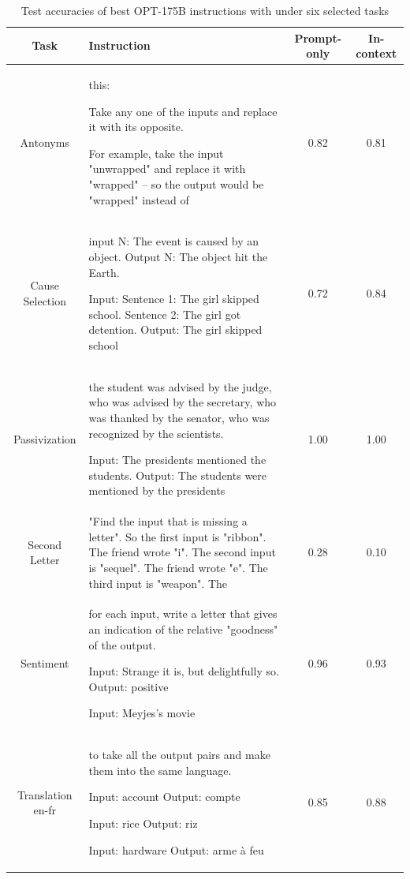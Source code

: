 \begin{table}[H]
\caption{Test accuracies of best OPT-175B instructions with \algname under six selected tasks}
\label{tab:opt_instructions}
\begin{center}
\begin{tabular}{cm{7cm}cc}
\toprule
\textbf{Task} & \textbf{Instruction} & \textbf{Prompt-only} & \textbf{In-context} \\
\midrule
Antonyms & this:

Take any one of the inputs and replace it with its opposite.

For example, take the input "unwrapped" and replace it with "wrapped" -- so the output would be "wrapped" instead of & 0.82 & 0.81\\
\midrule
Cause Selection & input N: The event is caused by an object. Output N: The object hit the Earth.

Input: Sentence 1: The girl skipped school. Sentence 2: The girl got detention.
Output: The girl skipped school & 0.72 & 0.84  \\
\midrule
Passivization & the student was advised by the judge, who was advised by the secretary, who was thanked by the senator, who was recognized by the scientists.

Input: The presidents mentioned the students.
Output: The students were mentioned by the presidents  & 1.00 & 1.00 \\
\midrule
Second Letter & "Find the input that is missing a letter".
So the first input is "ribbon". The friend wrote "i".
The second input is "sequel". The friend wrote "e".
The third input is "weapon". The & 0.28 & 0.10   \\
\midrule
Sentiment & for each input, write a letter that gives an indication of the relative "goodness" of the output.

Input: Strange it is, but delightfully so.
Output: positive

Input: Meyjes's movie & 0.96 & 0.93  \\
\midrule
Translation en-fr & to take all the output pairs and make them into the same language.

Input: account
Output: compte

Input: rice
Output: riz

Input: hardware
Output: arme à feu & 0.85 & 0.88 \\
\bottomrule
\end{tabular}
\end{center}
\end{table}


